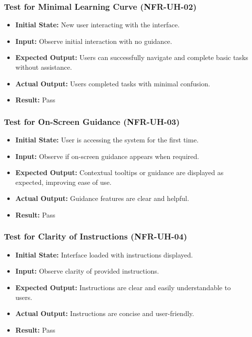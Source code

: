 \documentclass[12pt, titlepage]{article}
\begin{document}
\subsubsection{Test for Minimal Learning Curve (NFR-UH-02)}
\begin{itemize}
    \item \textbf{Initial State: }New user interacting with the interface.
    \item \textbf{Input: }Observe initial interaction with no guidance.
    \item \textbf{Expected Output: }Users can successfully navigate and complete basic tasks without assistance.
    \item \textbf{Actual Output: }Users completed tasks with minimal confusion.
    \item \textbf{Result: }Pass
\end{itemize}

\subsubsection{Test for On-Screen Guidance (NFR-UH-03)}
\begin{itemize}
    \item \textbf{Initial State: }User is accessing the system for the first time.
    \item \textbf{Input: }Observe if on-screen guidance appears when required.
    \item \textbf{Expected Output: }Contextual tooltips or guidance are displayed as expected, improving ease of use.
    \item \textbf{Actual Output: }Guidance features are clear and helpful.
    \item \textbf{Result: }Pass
\end{itemize}

\subsubsection{Test for Clarity of Instructions (NFR-UH-04)}
\begin{itemize}
    \item \textbf{Initial State: }Interface loaded with instructions displayed.
    \item \textbf{Input: }Observe clarity of provided instructions.
    \item \textbf{Expected Output: }Instructions are clear and easily understandable to users.
    \item \textbf{Actual Output: }Instructions are concise and user-friendly.
    \item \textbf{Result: }Pass
\end{itemize}
\end{document}
